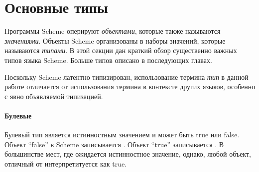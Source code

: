 \section{Основные типы}\vspace{1mm}

Программы Scheme оперируют \textit{объектами}, которые также называются
\textit{значениями}. Объекты Scheme организованы в наборы значений, которые называются
\textit{типами}. В этой секции дан краткий обзор существенно важных типов языка Scheme. Больше
типов описано в последующих главах.\vspace{1mm}

\begin{note}
  Поскольку Scheme латентно типизирован, использование термина \textit{тип} в данной работе
  отличается от использования термина в контексте других языков, особенно с явно объявляемой
  типизацией.
\end{note}

\paragraph{Булевые}\vspace{1mm}

Булевый тип является истинностным значением и может быть true или
false. Объект ``false'' в Scheme записывается \schfalse{}.  Объект ``true'' записывается
\schtrue{}. В большинстве мест, где ожидается истинностное значение, однако, любой объект,
отличный от \schfalse{} интерпретитуется как true.\vspace{1mm}

